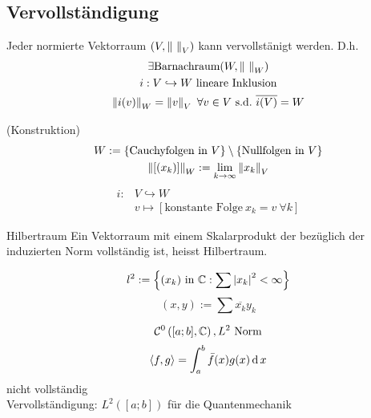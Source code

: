 \subsection{Vervollständigung}
\begin{Sat}
  Jeder normierte Vektorraum $(V,\Norm{\ }_V)$ kann vervollstänigt werden. D.h.
  \begin{gather*}
    \exists \text{Barnachraum}(W,\Norm{\ }_W)\\
    i:V\hookrightarrow W\ \text{lineare Inklusion}\\
    \Norm{i(v)}_W=\Norm{v}_V\ \forall v\in V\ \text{s.d.}\ \overline{i(V)}=W
  \end{gather*}
\end{Sat}
\begin{Bew}
  (Konstruktion)
  \begin{gather*}
    W:=\left\{ \text{Cauchyfolgen in $V$} \right\}\setminus\left\{ \text{Nullfolgen in $V$} \right\}\\
    \left\| \left[ (x_k) \right] \right\|_W:=\displaystyle\lim_{k\rightarrow\infty}\left\| x_k \right\|_V\\
  \end{gather*}
  \begin{align*}
    i:&V\hookrightarrow W\\
    &v\mapsto\left[ \text{konstante Folge}\ x_k=v\ \forall k \right]
  \end{align*}
\end{Bew}
\begin{Def}{Hilbertraum}
  Ein Vektorraum mit einem Skalarprodukt der bezüglich der induzierten Norm vollständig ist, heisst Hilbertraum.
\end{Def}
\begin{Bsp}
  \[l^2:=\left\{ (x_k)\ \text{in}\ \mb{C}:\sum\Abs{x_k}^2<\infty \right\}\]
  \[(x,y):=\sum \overline{x_k}y_k\]
\end{Bsp}
\begin{Bsp}
  \[\mathcal{C}^0\left( [a;b],\mathbb{C} \right), L^2\ \text{Norm}\]
  \[\left\langle f,g \right\rangle =\int^b_a\bar f(x)g(x)\operatorname{d} x\]
  nicht vollständig\\
  Vervollständigung: $L^2\left( [a;b] \right)$ für die Quantenmechanik
\end{Bsp}

